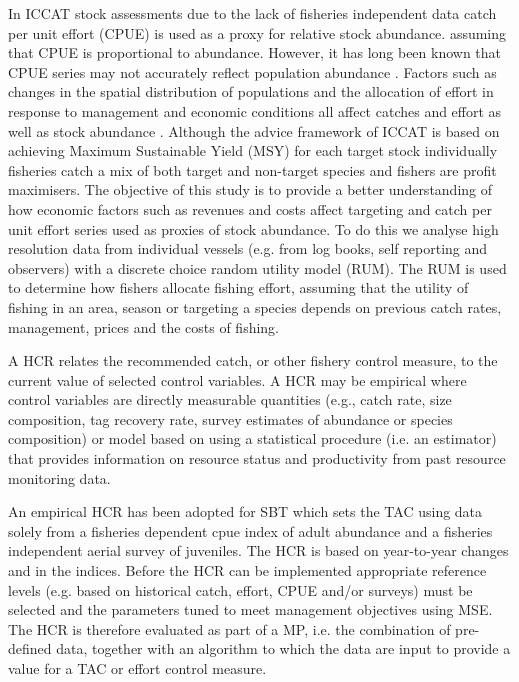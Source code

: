 \documentclass[a4paper, 10pt]{article}
\begin{document}
In ICCAT stock assessments due to the lack of fisheries independent data catch per unit effort (CPUE) is used as a proxy for relative stock abundance.
assuming that CPUE is proportional to abundance. However, it has long been known that CPUE series may not accurately reflect population 
abundance \cite{beverton_dynamics_1993, harley_is_2001, maunder_interpreting_2006, mckechnie_longline_2013,polacheck2006tuna}.
Factors such as changes in the spatial distribution of populations and the allocation of effort in response to
management and economic conditions all affect catches and effort as well as stock abundance \citep{paloheimo_abundance_1964, tidd2011exit}.
Although the advice framework of ICCAT is based on achieving Maximum Sustainable Yield (MSY) for each target stock individually
fisheries catch a mix of both target and non-target species and fishers are profit maximisers.
The objective of this study is to  provide a better understanding of how  economic factors such as revenues and costs affect targeting and
catch per unit effort series used as proxies of stock abundance.  To do this we analyse high resolution data from individual vessels 
(e.g. from log books, self reporting and observers)  with a discrete choice random utility model (RUM).  The RUM is used to
determine how fishers allocate fishing effort, assuming that the utility of fishing in an area, season or targeting a species depends 
on previous catch rates, management, prices and the costs of fishing. 


A \gls{HCR} relates the recommended catch, or other fishery control 
measure, to the current value of selected control variables. A HCR may be empirical where
control variables are directly measurable quantities (e.g., catch rate, size 
composition, tag recovery rate, survey estimates of abundance or species 
composition) or model based on using a statistical procedure (i.e. an estimator) 
that provides information on resource status and productivity from past resource 
monitoring data.

An empirical HCR has been adopted for \gls{SBT} which sets the \gls{TAC} 
using data solely from a fisheries dependent \gls{cpue} 
index of adult abundance and a fisheries independent aerial survey of juveniles. The HCR is based on year-to-year 
changes and in the indices. Before the HCR can be implemented appropriate 
reference levels (e.g. based on historical catch, effort, CPUE and/or surveys) must be selected and the parameters tuned 
to meet management objectives using \gls{MSE}. The HCR is therefore evaluated as part of a \gls{MP}, i.e. the combination of pre-defined data, 
together with an algorithm to which the data are input to provide a value for a TAC or effort control measure.
\end{document}
